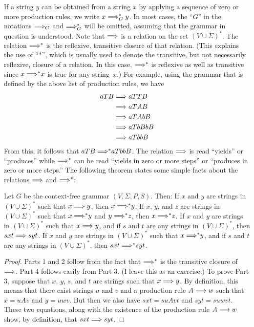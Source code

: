 If a string $y$ can be obtained from a string $x$ by
applying a sequence of zero or more production rules, we
write $x\Longrightarrow_G^* y$.  In most cases, the ``$G$'' in
the notations $\Longrightarrow_G$ and $\Longrightarrow_G^*$ will be omitted,
assuming that the grammar in question is understood.
Note that $\Longrightarrow$ is a relation on the set $(V\cup\Sigma)^*$.
The relation ${\Longrightarrow}^*$ is the reflexive, transitive closure of that relation.
(This explains the use of ``$*$'', which is usually used to
denote the transitive, but not necessarily reflexive, closure of a relation. 
In this case, ${\Longrightarrow}^*$ is reflexive as well as transitive since
$x\;{\Longrightarrow}^* x$ is true for any string~$x$.)
For example, using the grammar that is defined by the above
list of production rules, we have
\begin{align*}
 aTB&\Longrightarrow aTTB\\
    &\Longrightarrow aTAB\\
    &\Longrightarrow aTAbB\\
    &\Longrightarrow aTbBbB\\
    &\Longrightarrow aTbbB
\end{align*}
From this, it follows that $aTB\;{\Longrightarrow}^* aTbbB$.  The relation $\Longrightarrow$
is read ``yields'' or ``produces'' while ${\Longrightarrow}^*$ can be
read ``yields in zero or more steps'' or ``produces in zero or more
steps.''  The following theorem states some simple facts about
the relations $\Longrightarrow$ and ${\Longrightarrow}^*$:

\begin{theorem}\label{T-yields}
Let $G$ be the context-free grammar $(V,\Sigma,P,S)$.
Then:
If $x$ and $y$ are strings in $(V\cup\Sigma)^*$ such that $x\Longrightarrow y$, 
then $x\;{\Longrightarrow}^* y$.
If $x$, $y$, and $z$ are strings in $(V\cup\Sigma)^*$ such that $x\;{\Longrightarrow}^* y$
and $y\;{\Longrightarrow}^* z$, then $x\;{\Longrightarrow}^* z$.
If $x$ and $y$ are strings in $(V\cup\Sigma)^*$ such that $x\Longrightarrow y$, 
and if $s$ and $t$ are any strings in $(V\cup\Sigma)^*$, then $sxt\Longrightarrow syt$.
If $x$ and $y$ are strings in $(V\cup\Sigma)^*$ such that $x\;{\Longrightarrow}^* y$, 
and if $s$ and $t$ are any strings in $(V\cup\Sigma)^*$, then $sxt\;{\Longrightarrow}^* syt$.
\end{theorem}
\begin{proof}
Parts 1 and 2 follow from the fact that ${\Longrightarrow}^*$ is the transitive
closure of $\Longrightarrow$.  Part 4 follows easily from Part 3.  (I leave this
as an exercise.)  To prove Part 3, suppose that $x$, $y$, $s$, and $t$
are strings such that $x\Longrightarrow y$.  By definition, this means that
there exist strings $u$ and $v$ and a production rule $A\longrightarrow w$
such that $x=uAv$ and $y=uwv$.  But then we also have
$sxt=suAvt$ and $syt=suwvt$.  These two equations, along with
the existence of the production rule $A\longrightarrow w$ show, by definition,
that $sxt\Longrightarrow syt$.
\end{proof}

